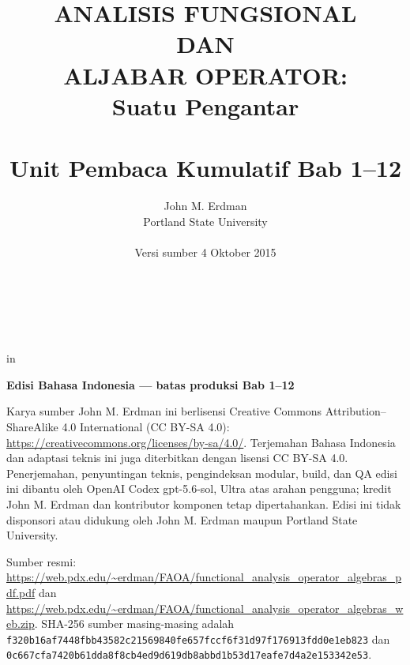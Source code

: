 \documentclass[11pt,reqno]{amsbook}
\theoremstyle{definition}
\theoremstyle{remark}
\numberwithin{equation}{section}
\begin{document}
 \frontmatter
 \title{ANALISIS FUNGSIONAL \\ DAN \\ ALJABAR OPERATOR: \\ Suatu Pengantar \\ \mbox{} \\ \large Unit Pembaca Kumulatif Bab 1--12}
 \author{John M. Erdman \\
      Portland State University \\
      \mbox{\hphantom{P}} \\
      Versi sumber 4 Oktober 2015 \\
      \mbox{\hphantom{P}} \\
      \mbox{\hphantom{P}} \\
            \mbox{\hphantom{P}} \\
                  \mbox{\hphantom{P}} }


 in


\maketitle


\begin{center}
\textbf{Edisi Bahasa Indonesia --- batas produksi Bab 1--12}
\end{center}

Karya sumber John M. Erdman ini berlisensi Creative Commons
Attribution--ShareAlike 4.0 International (CC BY-SA 4.0):
\url{https://creativecommons.org/licenses/by-sa/4.0/}.
Terjemahan Bahasa Indonesia dan adaptasi teknis ini juga diterbitkan dengan
lisensi CC BY-SA 4.0. Penerjemahan, penyuntingan teknis, pengindeksan modular,
build, dan QA edisi ini dibantu oleh OpenAI Codex gpt-5.6-sol, Ultra atas arahan
pengguna; kredit John M. Erdman dan kontributor komponen tetap dipertahankan.
Edisi ini tidak
disponsori atau didukung oleh John M. Erdman maupun Portland State University.

\begin{sloppypar}
Sumber resmi:
\url{https://web.pdx.edu/~erdman/FAOA/functional_analysis_operator_algebras_pdf.pdf}
dan
\url{https://web.pdx.edu/~erdman/FAOA/functional_analysis_operator_algebras_web.zip}.
SHA-256 sumber masing-masing adalah
\texttt{f320b16af7448fbb43582c21569840fe\allowbreak657fccf6f31d97f176913fdd0e1eb823}
dan
\texttt{0c667cfa7420b61dda8f8cb4ed9d619d\allowbreak b8abbd1b53d17eafe7d4a2e153342e53}.
\end{sloppypar}
\end{document}
